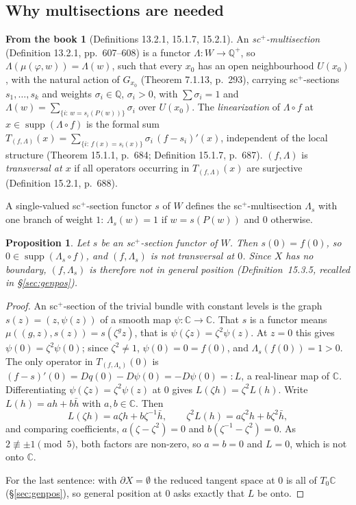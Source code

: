 \documentclass[11pt,a4paper]{article}
\theoremstyle{plain}
\newtheorem{proposition}[theorem]{Proposition}
\theoremstyle{definition}
\newtheorem{recall}[theorem]{From the book}
\theoremstyle{remark}
\newcommand{\C}{\mathbb{C}}
\newcommand{\Q}{\mathbb{Q}}
\newcommand{\supp}{\operatorname{supp}}
\begin{document}
\subsection{Why multisections are needed}

\begin{recall}[Definitions 13.2.1, 15.1.7, 15.2.1]\label{rec:multisection}
An \emph{sc$^+$-multisection} (Definition 13.2.1, pp.~607--608) is a functor $\Lambda\colon W\to\Q^+$,
so $\Lambda(\mu(\varphi,w))=\Lambda(w)$, such that every $x_0$ has an open neighbourhood $U(x_0)$, with
the natural action of $G_{x_0}$ (Theorem 7.1.13, p.~293), carrying sc$^+$-sections $s_1,\dots,s_k$ and
weights $\sigma_i\in\Q$, $\sigma_i>0$, with $\sum\sigma_i=1$ and
$\Lambda(w)=\sum_{\{i:\,w=s_i(P(w))\}}\sigma_i$ over $U(x_0)$. The \emph{linearization} of
$\Lambda\circ f$ at $x\in\supp(\Lambda\circ f)$ is the formal sum
$T_{(f,\Lambda)}(x)=\sum_{\{i:\,f(x)=s_i(x)\}}\sigma_i\,(f-s_i)'(x)$, independent of the local
structure (Theorem 15.1.1, p.~684; Definition 15.1.7, p.~687). $(f,\Lambda)$ is \emph{transversal at
$x$} if all operators occurring in $T_{(f,\Lambda)}(x)$ are surjective (Definition 15.2.1, p.~688).
\end{recall}

A single-valued sc$^+$-section functor $s$ of $W$ defines the sc$^+$-multisection $\Lambda_s$ with one
branch of weight $1$: $\Lambda_s(w)=1$ if $w=s(P(w))$ and $0$ otherwise.

\begin{proposition}\label{prop:obstruction}
Let $s$ be an sc$^+$-section functor of $W$. Then $s(0)=f(0)$, so $0\in\supp(\Lambda_s\circ f)$, and
$(f,\Lambda_s)$ is not transversal at $0$. Since $X$ has no boundary, $(f,\Lambda_s)$ is therefore not in
general position (Definition~15.3.5, recalled in \S\ref{sec:genpos}).
\end{proposition}

\begin{proof}
An sc$^+$-section of the trivial bundle with constant levels is the graph $s(z)=(z,\psi(z))$ of a smooth
map $\psi\colon\C\to\C$. That $s$ is a functor means $\mu((g,z),s(z))=s(\zeta^g z)$, that is
$\psi(\zeta z)=\zeta^2\psi(z)$. At $z=0$ this gives $\psi(0)=\zeta^2\psi(0)$; since $\zeta^2\neq1$,
$\psi(0)=0=f(0)$, and $\Lambda_s(f(0))=1>0$. The only operator in $T_{(f,\Lambda_s)}(0)$ is
$(f-s)'(0)=Dq(0)-D\psi(0)=-D\psi(0)=:L$, a real-linear map of $\C$. Differentiating
$\psi(\zeta z)=\zeta^2\psi(z)$ at $0$ gives $L(\zeta h)=\zeta^2L(h)$. Write $L(h)=ah+b\bar h$ with
$a,b\in\C$. Then
\[
  L(\zeta h)=a\zeta h+b\zeta^{-1}\bar h,\qquad \zeta^2L(h)=a\zeta^2h+b\zeta^2\bar h,
\]
and comparing coefficients, $a(\zeta-\zeta^2)=0$ and $b(\zeta^{-1}-\zeta^2)=0$. As
$2\not\equiv\pm1\pmod 5$, both factors are non-zero, so $a=b=0$ and $L=0$, which is not onto $\C$.

For the last sentence: with $\partial X=\emptyset$ the reduced tangent space at $0$ is all of $T_0\C$
(\S\ref{sec:genpos}), so general position at $0$ asks exactly that $L$ be onto.
\end{proof}
\end{document}

